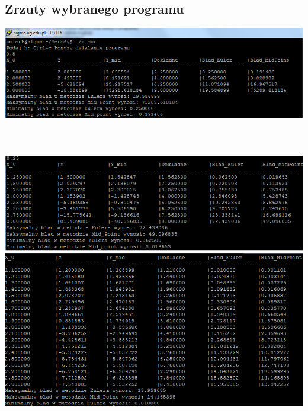 \documentclass[10pt]{article} %
\begin{document}
\subsection{Zrzuty wybranego programu}
\includegraphics{metody1.png}\\\\\\\\
\includegraphics{metody2.png}
\includegraphics{metody3.png}
\end{document}
